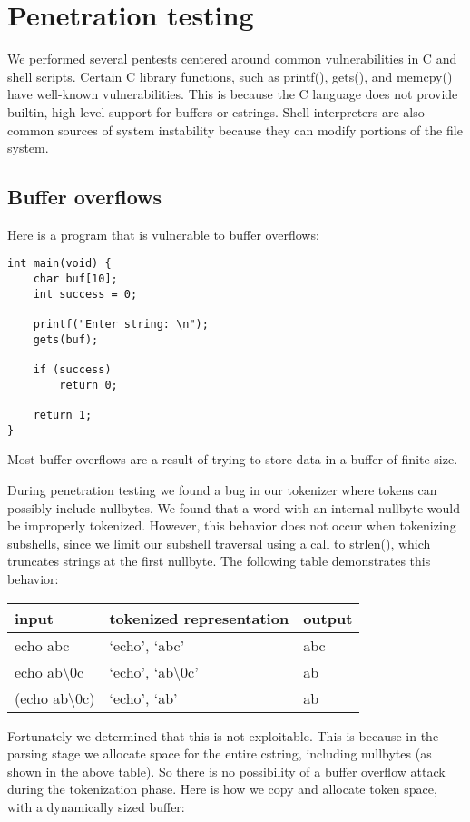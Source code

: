 \documentclass[12pt]{article}
\begin{document}
\section{Penetration testing}
We performed several pentests centered around common vulnerabilities in C and shell scripts. Certain C library functions, such as printf(), gets(), and memcpy() have well-known vulnerabilities\cite{formatstring,smashingthestack}. This is because the C language does not provide builtin, high-level support for buffers or cstrings. Shell interpreters are also common sources of system instability because they can modify portions of the file system.

\subsection{Buffer overflows}

Here is a program that is vulnerable to buffer overflows:
\begin{lstlisting}[frame=single]
int main(void) {
    char buf[10];
    int success = 0;
    
    printf("Enter string: \n");
    gets(buf);

    if (success)
        return 0;

    return 1;
}
\end{lstlisting}

Most buffer overflows are a result of trying to store data in a buffer of finite size.

During penetration testing we found a bug in our tokenizer where tokens can possibly include nullbytes. We found that a word with an internal nullbyte would be improperly tokenized. However, this behavior does not occur when tokenizing subshells, since we limit our subshell traversal using a call to strlen(), which truncates strings at the first nullbyte. The following table demonstrates this behavior:

  \begin{tabular}{ | l | l | l | }
    \hline
    input & tokenized representation & output \\ \hline
    echo abc & `echo', `abc' & abc \\ \hline
    echo ab\textbackslash0c & `echo', `ab\textbackslash0c' & ab \\ \hline
    (echo ab\textbackslash0c) & `echo', `ab' & ab \\
    \hline
  \end{tabular}

Fortunately we determined that this is not exploitable. This is because in the parsing stage we allocate space for the entire cstring, including nullbytes (as shown in the above table). So there is no possibility of a buffer overflow attack during the tokenization phase. Here is how we copy and allocate token space, with a dynamically sized buffer:
\end{document}
